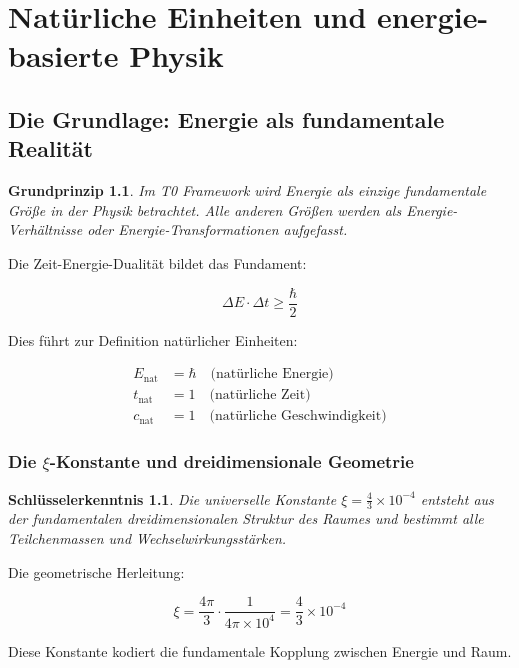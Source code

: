 \documentclass[12pt,a4paper]{report}
\newtheorem{prinzip}{Grundprinzip}[chapter]
\newtheorem{erkenntnis}{Schlüsselerkenntnis}[chapter]
\begin{document}
	\chapter{Natürliche Einheiten und energie-basierte Physik}
	
	\section{Die Grundlage: Energie als fundamentale Realität}
	
	\begin{prinzip}
		Im T0 Framework wird Energie als einzige fundamentale Größe in der Physik betrachtet. Alle anderen Größen werden als Energie-Verhältnisse oder Energie-Transformationen aufgefasst.
	\end{prinzip}
	
	Die Zeit-Energie-Dualität bildet das Fundament:
	
	\begin{equation}
		\Delta E \cdot \Delta t \geq \frac{\hbar}{2}
	\end{equation}
	
	Dies führt zur Definition natürlicher Einheiten:
	
	\begin{align}
		E_{\text{nat}} &= \hbar \quad \text{(natürliche Energie)} \\
		t_{\text{nat}} &= 1 \quad \text{(natürliche Zeit)} \\
		c_{\text{nat}} &= 1 \quad \text{(natürliche Geschwindigkeit)}
	\end{align}
	
	\subsection{Die $\xi$-Konstante und dreidimensionale Geometrie}
	
	\begin{erkenntnis}
		Die universelle Konstante $\xi = \frac{4}{3} \times 10^{-4}$ entsteht aus der fundamentalen dreidimensionalen Struktur des Raumes und bestimmt alle Teilchenmassen und Wechselwirkungsstärken.
	\end{erkenntnis}
	
	Die geometrische Herleitung:
	
	\begin{equation}
		\xi = \frac{4\pi}{3} \cdot \frac{1}{4\pi \times 10^4} = \frac{4}{3} \times 10^{-4}
	\end{equation}
	
	Diese Konstante kodiert die fundamentale Kopplung zwischen Energie und Raum.
	
\end{document}

